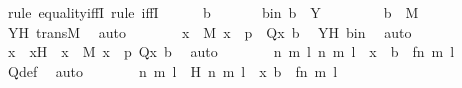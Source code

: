 \begin{isabellebody}
\ {\isacharparenleft}{\kern0pt}rule\ equality{\isacharunderscore}{\kern0pt}iffI{\isacharcomma}{\kern0pt}\ rule\ iffI{\isacharparenright}{\kern0pt}\isanewline
\ \ \ \ \isamarkupfalse%
\ b\ \isanewline
\ \ \ \ \isamarkupfalse%
\ bin{\isacharcolon}{\kern0pt}\ {\isachardoublequoteopen}b\ {\isasymin}\ Y{\isachardoublequoteclose}\ \isanewline
\ \ \ \ \isamarkupfalse%
\ \isamarkupfalse%
\ {\isachardoublequoteopen}b\ {\isasymin}\ M{\isachardoublequoteclose}\ \isamarkupfalse%
\ YH\ transM\ \isamarkupfalse%
\ auto\isanewline
\ \ \ \ \isamarkupfalse%
\ \isamarkupfalse%
\ {\isachardoublequoteopen}{\isasymexists}x\ {\isasymin}\ M{\isachardot}{\kern0pt}\ x\ {\isasymin}\ p\ {\isasymand}\ Q{\isacharparenleft}{\kern0pt}x{\isacharcomma}{\kern0pt}\ b{\isacharparenright}{\kern0pt}{\isachardoublequoteclose}\ \isamarkupfalse%
\ YH\ bin\ \isamarkupfalse%
\ auto\isanewline
\ \ \ \ \isamarkupfalse%
\ \isamarkupfalse%
\ x\ \ xH\ {\isacharcolon}{\kern0pt}\ {\isachardoublequoteopen}x\ {\isasymin}\ M{\isachardoublequoteclose}\ {\isachardoublequoteopen}x\ {\isasymin}\ p{\isachardoublequoteclose}\ {\isachardoublequoteopen}Q{\isacharparenleft}{\kern0pt}x{\isacharcomma}{\kern0pt}\ b{\isacharparenright}{\kern0pt}{\isachardoublequoteclose}\ \isamarkupfalse%
\ auto\isanewline
\ \ \ \ \isamarkupfalse%
\ \isamarkupfalse%
\ {\isachardoublequoteopen}{\isasymexists}n\ m\ l{\isachardot}{\kern0pt}\ {\isacharless}{\kern0pt}{\isacharless}{\kern0pt}n{\isacharcomma}{\kern0pt}\ m{\isachargreater}{\kern0pt}{\isacharcomma}{\kern0pt}\ l{\isachargreater}{\kern0pt}\ {\isacharequal}{\kern0pt}\ x\ {\isasymand}\ b\ {\isacharequal}{\kern0pt}\ {\isacharless}{\kern0pt}{\isacharless}{\kern0pt}f{\isacharbackquote}{\kern0pt}n{\isacharcomma}{\kern0pt}\ m{\isachargreater}{\kern0pt}{\isacharcomma}{\kern0pt}\ l{\isachargreater}{\kern0pt}{\isachardoublequoteclose}\ \isamarkupfalse%
\ Q{\isacharunderscore}{\kern0pt}def\ \isamarkupfalse%
\ auto\isanewline
\ \ \ \ \isamarkupfalse%
\ \isamarkupfalse%
\ n\ m\ l\ \ H{\isacharcolon}{\kern0pt}\ {\isachardoublequoteopen}{\isacharless}{\kern0pt}{\isacharless}{\kern0pt}n{\isacharcomma}{\kern0pt}\ m{\isachargreater}{\kern0pt}{\isacharcomma}{\kern0pt}\ l{\isachargreater}{\kern0pt}\ {\isacharequal}{\kern0pt}\ x{\isachardoublequoteclose}\ {\isachardoublequoteopen}b\ {\isacharequal}{\kern0pt}\ {\isacharless}{\kern0pt}{\isacharless}{\kern0pt}f{\isacharbackquote}{\kern0pt}n{\isacharcomma}{\kern0pt}\ m{\isachargreater}{\kern0pt}{\isacharcomma}{\kern0pt}\ l{\isachargreater}{\kern0pt}{\isachardoublequoteclose}\ \isamarkupfalse%

\end{isabellebody}
